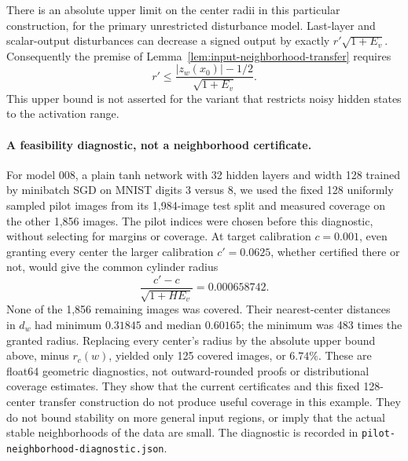 There is an absolute upper limit on the center radii in this particular
construction, for the primary unrestricted disturbance model. Last-layer
and scalar-output disturbances can decrease a signed output by exactly
$r'\sqrt{1+E_v}$. Consequently the premise of
Lemma~\ref{lem:input-neighborhood-transfer} requires
\[
 r'\le\frac{|z_w(x_0)|-1/2}{\sqrt{1+E_v}}.
\]
This upper bound is not asserted for the variant that restricts noisy
hidden states to the activation range.

\paragraph{A feasibility diagnostic, not a neighborhood certificate.}
For model 008, a plain tanh network with 32 hidden layers and width 128
trained by minibatch SGD on MNIST digits 3 versus 8, we used the fixed
128 uniformly sampled pilot images from its 1,984-image test split and
measured coverage on the other 1,856 images. The pilot indices were
chosen before this diagnostic, without selecting for margins or
coverage. At target calibration $c=0.001$, even granting every center
the larger calibration $c'=0.0625$, whether certified there or not,
would give the common cylinder radius
\[
 \frac{c'-c}{\sqrt{1+HE_v}}=0.000658742.
\]
None of the 1,856 remaining images was covered. Their nearest-center
distances in $d_w$ had minimum $0.31845$ and median $0.60165$; the
minimum was 483 times the granted radius. Replacing every center's
radius by the absolute upper bound above, minus $r_c(w)$, yielded only
125 covered images, or $6.74\%$. These are float64 geometric diagnostics,
not outward-rounded proofs or distributional coverage estimates. They
show that the current certificates and this fixed 128-center transfer
construction do not produce useful coverage in this example. They do
not bound stability on more general input regions, or imply that the
actual stable neighborhoods of the data are small. The diagnostic is
recorded in \texttt{pilot-neighborhood-diagnostic.json}.
